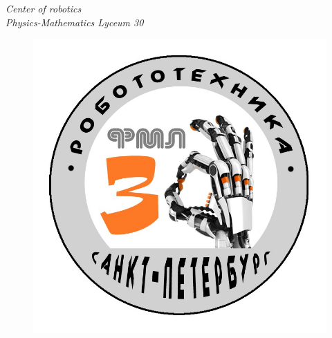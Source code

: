 \thispagestyle{titlestyle}
\begin{titlepage}
	
	\begin{center}
		\LARGE\textit{Center of robotics \\ Physics-Mathematics Lyceum 30}
		\begin{figure}[H]
			\begin{minipage}[h]{0.47\linewidth}
			\end{minipage}
			\hfill
			\begin{minipage}{0.47\linewidth}
				\includegraphics[scale=0.15]{0Title/images/02}
			\end{minipage}
		\end{figure}
		\vspace{3em}
		

\end{center}
\end{titlepage}
